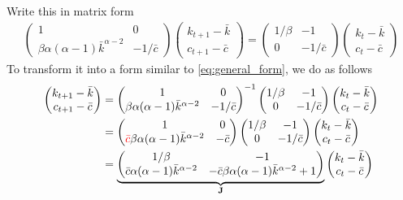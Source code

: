 \documentclass[11pt,a4paper]{book}
\newcommand{\red}[1]{\textcolor{red}{#1}}
\theoremstyle{definition}\newtheorem{definition}{Definition}
\theoremstyle{definition}\newtheorem{fact}{Fact}
\theoremstyle{definition}\newtheorem{remark}{Remark}
\theoremstyle{definition}\newtheorem{ex}{Ex.}
\theoremstyle{definition}\newtheorem{project}{Project}
\theoremstyle{definition}\newtheorem{problem}{Problem}
\theoremstyle{definition}\newtheorem{example}{Example}
\numberwithin{theorem}{section}
\numberwithin{corollary}{chapter}
\numberwithin{assumption}{chapter}
\numberwithin{definition}{chapter}
\numberwithin{prop}{chapter}
\numberwithin{notation}{chapter}
\numberwithin{problem}{chapter}
\numberwithin{example}{chapter}
\numberwithin{fact}{chapter}
\numberwithin{ex}{chapter}
\def\J{\mathbf J}
\begin{document}
	Write this in matrix form
	\begin{align*}
		\begin{pmatrix}
			1 & 0 \\
			\beta \alpha(\alpha-1)\bar{k}^{\alpha-2} & -1/\bar{c} 
		\end{pmatrix}
		\begin{pmatrix}
			k_{t+1} - \bar{k} \\
			c_{t+1} - \bar{c}
		\end{pmatrix}
		=
		\begin{pmatrix}
			1/\beta & -1 \\
			0 & -1/\bar{c}
		\end{pmatrix}
		\begin{pmatrix}
			k_{t} - \bar{k} \\
			c_{t} - \bar{c}
		\end{pmatrix}
	\end{align*}
	To transform it into a form similar to \eqref{eq:general_form}, we do as follows
	\begin{align*}
		\begin{pmatrix}
			k_{t+1} - \bar{k} \\
			c_{t+1} - \bar{c}
		\end{pmatrix}
		&=
		\begin{pmatrix}
			1 & 0 \\
			\beta \alpha(\alpha-1)\bar{k}^{\alpha-2} & -1/\bar{c} 
		\end{pmatrix}^{-1}
		\begin{pmatrix}
			1/\beta & -1 \\
			0 & -1/\bar{c}
		\end{pmatrix}
		\begin{pmatrix}
			k_{t} - \bar{k} \\
			c_{t} - \bar{c}
		\end{pmatrix} \\
		&= \begin{pmatrix}
			1 & 0 \\
			\red{\bar{c}}\beta \alpha(\alpha-1)\bar{k}^{\alpha-2} & -\bar{c} 
		\end{pmatrix}
		\begin{pmatrix}
			1/\beta & -1 \\
			0 & -1/\bar{c}
		\end{pmatrix}
		\begin{pmatrix}
			k_{t} - \bar{k} \\
			c_{t} - \bar{c}
		\end{pmatrix} \\
		&= \underbrace{\begin{pmatrix}
				1/\beta & -1 \\
				\bar{c} \alpha(\alpha-1)\bar{k}^{\alpha-2} & -\bar{c} \beta\alpha(\alpha-1)\bar{k}^{\alpha-2} + 1
		\end{pmatrix}}_{\J}
		\begin{pmatrix}
			k_{t} - \bar{k} \\
			c_{t} - \bar{c}
		\end{pmatrix}
	\end{align*}
\end{document}
